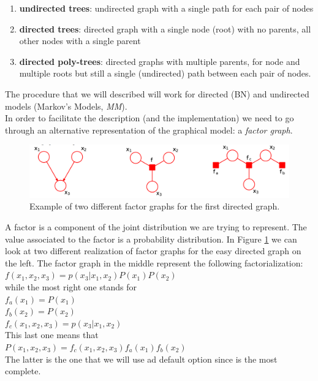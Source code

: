 \begin{enumerate}[label=(\alph{*})]
	\item \textbf{undirected trees}: undirected graph with a single path for each pair
		of nodes

	\item \textbf{directed trees}: directed graph with a single node (root) with no
		parents, all other nodes with a single parent

	\item \textbf{directed poly-trees}: directed graphs with multiple parents, for
		node and multiple roots but still a single (undirected) path between each
		pair of nodes.
\end{enumerate}

The procedure that we will described will work for directed (BN) and undirected models
(Markov's Models, \textit{MM}).\\

In order to facilitate the description (and the implementation) we need to go
through an alternative representation of the graphical model: a \textit{factor
graph}. 
\begin{figure}[H]
	\centering
	\includegraphics[scale=0.3]{
		images/09_BayesianNetworksInference_factorGraph.png
	}
	\caption{Example of two different factor graphs for the first directed graph.}
	\label{fig:factor_graph}
\end{figure}
A factor is a component of the joint distribution we are trying to represent. The
value associated to the factor is a probability distribution. In Figure
\ref{fig:factor_graph} we can look at two different realization of factor graphs
for the easy directed graph on the left. The factor graph in the middle represent
the following factorialization: \\
$f(x_{1}, x_{2}, x_{3}) = p(x_{3}|x_{1}, x_{2})P(x_{1})P(x_{2})$\\ while the most
right one stands for \\ $f_{a}(x_{1}) = P(x_{1})$\\ $f_{b}(x_{2}) = P(x_{2})$\\ $f
_{c}(x_{1}, x_{2}, x_{3}) = p(x_{3}|x_{1}, x_{2})$\\ This last one means that \\
$P(x_{1}, x_{2}, x_{3}) = f_{c}(x_{1}, x_{2}, x_{3})f_{a}(x_{1})f_{b}(x_{2})$\\ The
latter is the one that we will use ad default option since is the most complete.

